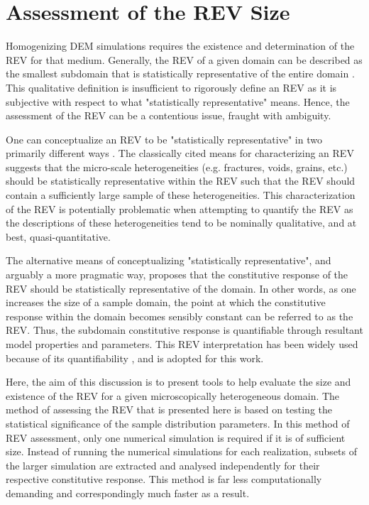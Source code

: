 \section{Assessment of the REV Size}

Homogenizing DEM simulations requires the existence and determination of the REV for that medium. Generally, the REV of a given domain can be described as the smallest subdomain that is statistically representative of the entire domain \citep{Kanit_2003, Gitman_2007}. This qualitative definition is insufficient to rigorously define an REV as it is subjective with respect to what "statistically representative" means. Hence, the assessment of the REV can be a contentious issue, fraught with ambiguity.

One can conceptualize an REV to be "statistically representative" in two primarily different ways \citep{Drugan_1996}. The classically cited means for characterizing an REV suggests that the micro-scale heterogeneities (e.g. fractures, voids, grains, etc.) should be statistically representative within the REV such that the REV should contain a sufficiently large sample of these heterogeneities. This characterization of the REV is potentially problematic when attempting to quantify the REV as the descriptions of these heterogeneities tend to be nominally qualitative, and at best, quasi-quantitative.

The alternative means of conceptualizing "statistically representative", and arguably a more pragmatic way, proposes that the constitutive response of the REV should be statistically representative of the domain. In other words, as one increases the size of a sample domain, the point at which the constitutive response within the domain becomes sensibly constant can be referred to as the REV. Thus, the subdomain constitutive response is quantifiable through resultant model properties and parameters. This REV interpretation has been widely used because of its quantifiability \citep{Kanit_2003, Gitman_2005, Gusev_1997, M_ller_2010}, and is adopted for this work.

Here, the aim of this discussion is to present tools to help evaluate the size and existence of the REV for a given microscopically heterogeneous domain. The method of assessing the REV that is presented here is based on testing the statistical significance of the sample distribution parameters. In this method of REV assessment, only one numerical simulation is required if it is of sufficient size. Instead of running the numerical simulations for each realization, subsets of the larger simulation are extracted and analysed independently for their respective constitutive response. This method is far less computationally demanding and correspondingly much faster as a result.  

